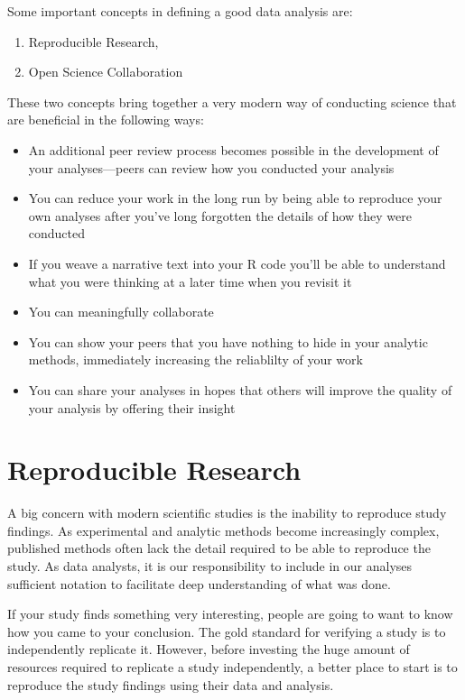 \documentclass[]{book}
\providecommand{\tightlist}{%
  \setlength{\itemsep}{0pt}\setlength{\parskip}{0pt}}
\begin{document}
Some important concepts in defining a good data analysis are:

\begin{enumerate}
\def\labelenumi{\arabic{enumi})}
\tightlist
\item
  Reproducible Research,
\item
  Open Science Collaboration
\end{enumerate}

These two concepts bring together a very modern way of conducting
science that are beneficial in the following ways:

\begin{itemize}
\tightlist
\item
  An additional peer review process becomes possible in the development
  of your analyses---peers can review how you conducted your analysis
\item
  You can reduce your work in the long run by being able to reproduce
  your own analyses after you've long forgotten the details of how they
  were conducted
\item
  If you weave a narrative text into your R code you'll be able to
  understand what you were thinking at a later time when you revisit it
\item
  You can meaningfully collaborate
\item
  You can show your peers that you have nothing to hide in your analytic
  methods, immediately increasing the reliablilty of your work
\item
  You can share your analyses in hopes that others will improve the
  quality of your analysis by offering their insight
\end{itemize}

\section{Reproducible Research}\label{reproducible-research}

A big concern with modern scientific studies is the inability to
reproduce study findings. As experimental and analytic methods become
increasingly complex, published methods often lack the detail required
to be able to reproduce the study. As data analysts, it is our
responsibility to include in our analyses sufficient notation to
facilitate deep understanding of what was done.

If your study finds something very interesting, people are going to want
to know how you came to your conclusion. The gold standard for verifying
a study is to independently replicate it. However, before investing the
huge amount of resources required to replicate a study independently, a
better place to start is to reproduce the study findings using their
data and analysis.
\end{document}

